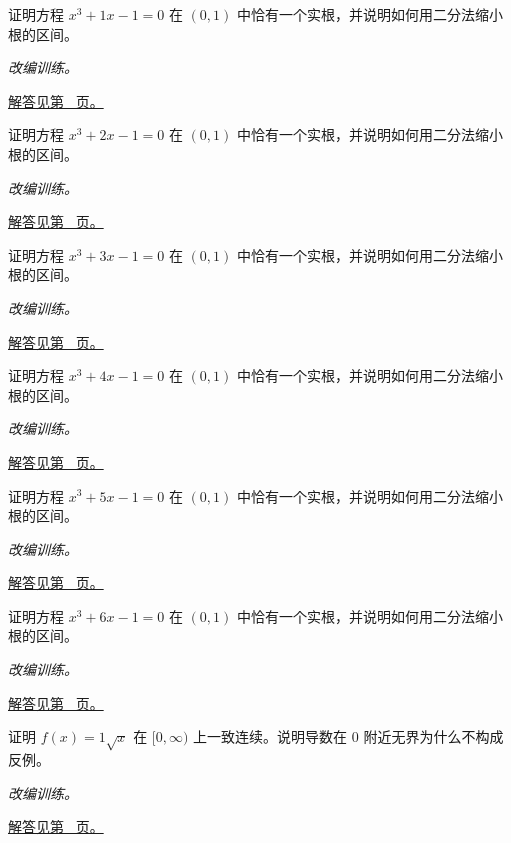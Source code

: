 \documentclass[UTF8,12pt,a4paper,fontset=fandol]{ctexart}
\begin{document}
\begin{example}[介值定理与单调性]\label{ex:c6q7}
证明方程 $x^3+1x-1=0$ 在 $(0,1)$ 中恰有一个实根，并说明如何用二分法缩小根的区间。
\par\textit{改编训练。}\par\hyperref[ans:c6q7]{解答见第~\pageref{ans:c6q7} 页。}
\end{example}
\begin{example}[介值定理与单调性]\label{ex:c6q8}
证明方程 $x^3+2x-1=0$ 在 $(0,1)$ 中恰有一个实根，并说明如何用二分法缩小根的区间。
\par\textit{改编训练。}\par\hyperref[ans:c6q8]{解答见第~\pageref{ans:c6q8} 页。}
\end{example}
\begin{example}[介值定理与单调性]\label{ex:c6q9}
证明方程 $x^3+3x-1=0$ 在 $(0,1)$ 中恰有一个实根，并说明如何用二分法缩小根的区间。
\par\textit{改编训练。}\par\hyperref[ans:c6q9]{解答见第~\pageref{ans:c6q9} 页。}
\end{example}
\begin{example}[介值定理与单调性]\label{ex:c6q10}
证明方程 $x^3+4x-1=0$ 在 $(0,1)$ 中恰有一个实根，并说明如何用二分法缩小根的区间。
\par\textit{改编训练。}\par\hyperref[ans:c6q10]{解答见第~\pageref{ans:c6q10} 页。}
\end{example}
\begin{example}[介值定理与单调性]\label{ex:c6q11}
证明方程 $x^3+5x-1=0$ 在 $(0,1)$ 中恰有一个实根，并说明如何用二分法缩小根的区间。
\par\textit{改编训练。}\par\hyperref[ans:c6q11]{解答见第~\pageref{ans:c6q11} 页。}
\end{example}
\begin{example}[介值定理与单调性]\label{ex:c6q12}
证明方程 $x^3+6x-1=0$ 在 $(0,1)$ 中恰有一个实根，并说明如何用二分法缩小根的区间。
\par\textit{改编训练。}\par\hyperref[ans:c6q12]{解答见第~\pageref{ans:c6q12} 页。}
\end{example}
\begin{example}[一致连续与无界导数]\label{ex:c6q13}
证明 $f(x)=1\sqrt x$ 在 $[0,\infty)$ 上一致连续。说明导数在 $0$ 附近无界为什么不构成反例。
\par\textit{改编训练。}\par\hyperref[ans:c6q13]{解答见第~\pageref{ans:c6q13} 页。}
\end{example}
\end{document}
